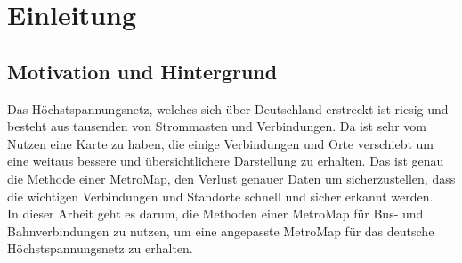 
\chapter{Einleitung}
\label{Einleitung}

\section{Motivation und Hintergrund}
\label{Motivation_und_Hintergrund}
%
Das Höchstspannungsnetz, welches sich über Deutschland erstreckt ist riesig und besteht aus tausenden von Strommasten und Verbindungen. Da ist sehr vom Nutzen eine Karte zu haben, die einige Verbindungen und Orte verschiebt um eine weitaus bessere und übersichtlichere Darstellung zu erhalten. Das ist genau die Methode einer MetroMap, den Verlust genauer Daten um sicherzustellen, dass die wichtigen Verbindungen und Standorte schnell und sicher erkannt werden.
\\
In dieser Arbeit geht es darum, die Methoden einer MetroMap für Bus- und Bahnverbindungen zu nutzen, um eine angepasste MetroMap für das deutsche Höchstspannungsnetz zu erhalten. 


